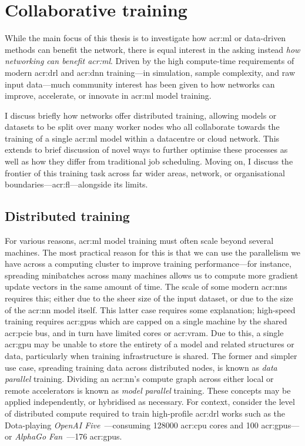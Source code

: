 \section{Collaborative training}
While the main focus of this thesis is to investigate how \gls{acr:ml} or data-driven methods can benefit the network, there is equal interest in the asking instead \emph{how networking can benefit \gls{acr:ml}}.
Driven by the high compute-time requirements of modern \gls{acr:drl} and \gls{acr:dnn} training---in simulation, sample complexity, and raw input data---much community interest has been given to how networks can improve, accelerate, or innovate in \gls{acr:ml} model training.

I discuss briefly how networks offer distributed training, allowing models or datasets to be split over many worker nodes who all collaborate towards the training of a single \gls{acr:ml} model within a datacentre or cloud network.
This extends to brief discussion of novel ways to further optimise these processes as well as how they differ from traditional job scheduling.
Moving on, I discuss the frontier of this training task across far wider areas, network, or organisational boundaries---\acrfull{acr:fl}---alongside its limits.


\subsection{Distributed training}
For various reasons, \gls{acr:ml} model training must often scale beyond several machines.
The most practical reason for this is that we can use the parallelism we have across a computing cluster to improve training performance---for instance, spreading minibatches across many machines allows us to compute more gradient update vectors in the same amount of time.
The scale of some modern \glspl{acr:nn} requires this; either due to the sheer size of the input dataset, or due to the size of the \gls{acr:nn} model itself.
This latter case requires some explanation; high-speed training requires \glspl{acr:gpu} which are capped on a single machine by the shared \gls{acr:pcie} bus, and in turn have limited cores or \gls{acr:vram}.
Due to this, a single \gls{acr:gpu} may be unable to store the entirety of a model and related structures or data, particularly when training infrastructure is shared.
The former and simpler use case, spreading training data across distributed nodes, is known as \emph{data parallel} training.
Dividing an \gls{acr:nn}'s compute graph across either local or remote accelerators is known as \emph{model parallel} training.
These concepts may be applied independently, or hybridised as necessary.
For context, consider the level of distributed compute required to train high-profile \gls{acr:drl} works such as the Dota-playing \emph{OpenAI Five}~\parencite{openai-five}---consuming \num{128000} \gls{acr:cpu} cores and \num{100} \glspl{acr:gpu}---or \emph{AlphaGo Fan}~\parencite{DBLP:journals/nature/SilverSSAHGHBLB17}---\num{176} \glspl{acr:gpu}. 	

